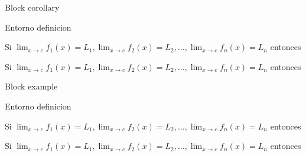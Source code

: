 \documentclass[]{beamer}
\theoremstyle{plain}
\begin{document}
\begin{frame}[fragile]{Block corollary}
\begin{source}{Entorno definicion}{}
\begin{corollary}
 Si \hspace{5pt}$\displaystyle \lim_{x\rightarrow c}f_1(x)=L_1, \displaystyle \lim_{x\rightarrow c}f_2(x)=L_2,\dots, \displaystyle \lim_{x\rightarrow c}f_n(x)=L_n $
 entonces
\end{corollary}
\end{source}
\begin{corollary}
 Si \hspace{5pt}$\displaystyle \lim_{x\rightarrow c}f_1(x)=L_1, \displaystyle \lim_{x\rightarrow c}f_2(x)=L_2,\dots, \displaystyle \lim_{x\rightarrow c}f_n(x)=L_n $
 entonces
\end{corollary}
\end{frame}
\begin{frame}[fragile]{Block example}
\begin{source}{Entorno definicion}{}
\begin{example}
 Si \hspace{5pt}$\displaystyle \lim_{x\rightarrow c}f_1(x)=L_1, \displaystyle \lim_{x\rightarrow c}f_2(x)=L_2,\dots, \displaystyle \lim_{x\rightarrow c}f_n(x)=L_n $
 entonces
\end{example}
\end{source}
\begin{example}
 Si \hspace{5pt}$\displaystyle \lim_{x\rightarrow c}f_1(x)=L_1, \displaystyle \lim_{x\rightarrow c}f_2(x)=L_2,\dots, \displaystyle \lim_{x\rightarrow c}f_n(x)=L_n $
 entonces
\end{example}
\end{frame}
\end{document}
